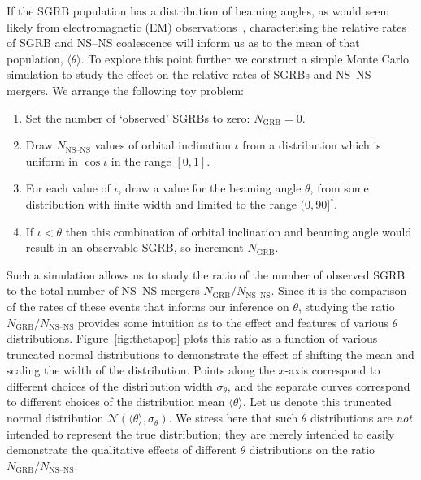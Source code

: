 \documentclass[twocolumn]{aastex61}
\newcommand{\BNS}{\ac{NS}--\ac{NS}\xspace}
\def\electro#1{electromagnetic#1 (EM#1)\gdef\electro{EM}}
\begin{document}
If the \ac{SGRB} population has a distribution of beaming angles, as would seem
likely from \electro{} observations~\cite{Fong:2015oha}, characterising the
relative rates of \ac{SGRB} and \BNS coalescence will inform us as to the mean
of that population, $\langle \theta \rangle$.  To explore this point further we
construct a simple Monte Carlo simulation to study the effect on the relative
rates of \acp{SGRB} and \BNS mergers. We arrange the following toy problem:
%
\begin{enumerate}
    \item Set the number of `observed' \acp{SGRB} to zero: $N_{\mathrm{GRB}}=0$.
    \item Draw $N_{\text{NS--NS}}$ values of orbital inclination $\iota$ from a distribution which is uniform in $\cos \iota$ in the range $[0,1]$.
    \item For each value of $\iota$, draw a value for the beaming angle $\theta$, from some distribution with finite width and limited to the range $(0,90]^{\circ}$.
    \item If $\iota<\theta$ then this combination of orbital inclination and beaming angle would result in an observable \ac{SGRB}, so increment $N_{\mathrm{GRB}}$.
\end{enumerate}
%
Such a simulation allows us to study the ratio of the number of
observed \ac{SGRB} to the total number of \BNS mergers
$N_{\mathrm{GRB}}/N_{\text{NS--NS}}$.  Since it is the comparison of
the rates of these events that informs our inference on $\theta$,
studying the ratio $N_{\mathrm{GRB}}/N_{\text{NS--NS}}$ provides some
intuition as to the effect and features of various $\theta$
distributions.  Figure~\ref{fig:thetapop} plots this ratio as a
function of various truncated normal distributions to demonstrate the
effect of shifting the mean and scaling the width of the distribution.
Points along the $x$-axis correspond to different choices of the
distribution width $\sigma_{\theta}$, and the separate curves
correspond to different choices of the distribution mean
$\langle \theta \rangle$.  Let us denote this truncated normal
distribution ${\mathcal N}(\langle \theta \rangle, \sigma_{\theta})$.
We stress here that such $\theta$ distributions are \emph{not}
intended to represent the true distribution; they are merely intended
to easily demonstrate the qualitative effects of different $\theta$
distributions on the ratio $N_{\mathrm{GRB}}/N_{\text{NS--NS}}$.
\end{document}
